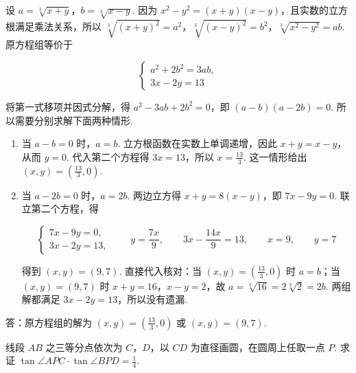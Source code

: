 \begin{solution}
设 \(a=\sqrt[3]{x+y}\)，\(b=\sqrt[3]{x-y}\). 因为 \(x^2-y^2=\left(x+y\right)\left(x-y\right)\)，且实数的立方根满足乘法关系，所以
\(\sqrt[3]{\left(x+y\right)^2}=a^2\)，\(\sqrt[3]{\left(x-y\right)^2}=b^2\)，\(\sqrt[3]{x^2-y^2}=ab\). 原方程组等价于

\[
\begin{cases}
a^2+2b^2=3ab,\\
3x-2y=13
\end{cases}
\]

将第一式移项并因式分解，得 \(a^2-3ab+2b^2=0\)，即 \(\left(a-b\right)\left(a-2b\right)=0\). 所以需要分别求解下面两种情形.

\begin{enumerate}
\item 当 \(a-b=0\) 时，\(a=b\). 立方根函数在实数上单调递增，因此 \(x+y=x-y\)，从而 \(y=0\). 代入第二个方程得 \(3x=13\)，所以 \(x=\frac{13}{3}\). 这一情形给出 \(\left(x,y\right)=\left(\frac{13}{3},0\right)\).
\item 当 \(a-2b=0\) 时，\(a=2b\). 两边立方得 \(x+y=8\left(x-y\right)\)，即 \(7x-9y=0\). 联立第二个方程，得

\[
\begin{cases}
7x-9y=0,\\
3x-2y=13,
\end{cases}
\qquad y=\frac{7x}{9},
\qquad 3x-\frac{14x}{9}=13,
\qquad x=9,\qquad y=7
\]

得到 \(\left(x,y\right)=\left(9,7\right)\). 直接代入核对：当 \(\left(x,y\right)=\left(\frac{13}{3},0\right)\) 时 \(a=b\)；当 \(\left(x,y\right)=\left(9,7\right)\) 时 \(x+y=16\)，\(x-y=2\)，故 \(a=\sqrt[3]{16}=2\sqrt[3]{2}=2b\). 两组解都满足 \(3x-2y=13\)，所以没有遗漏.
\end{enumerate}

答：原方程组的解为 \(\left(x,y\right)=\left(\frac{13}{3},0\right)\) 或 \(\left(x,y\right)=\left(9,7\right)\).
\end{solution}

\begin{problem}
线段 \(AB\) 之三等分点依次为 \(C\)，\(D\)，以 \(CD\) 为直径画圆，在圆周上任取一点 \(P\). 求证 \(\tan\angle APC\cdot\tan\angle BPD=\frac{1}{4}\).

\end{problem}


